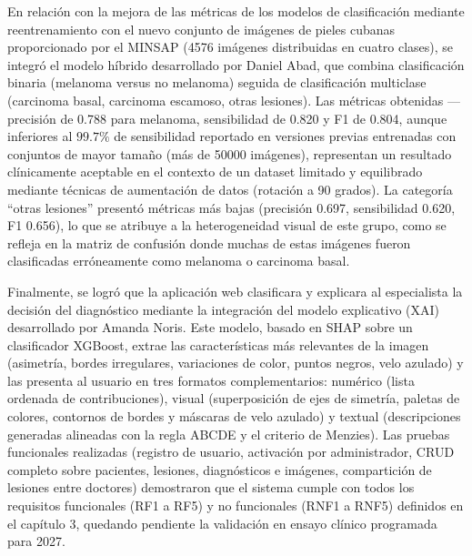 \begin{conclusions}
En relación con la mejora de las métricas de los modelos de clasificación mediante 
reentrenamiento con el nuevo conjunto de imágenes de pieles cubanas proporcionado por el 
MINSAP (4576 imágenes distribuidas en cuatro clases), se integró el modelo híbrido 
desarrollado por Daniel Abad, que combina clasificación binaria (melanoma versus no melanoma) 
seguida de clasificación multiclase (carcinoma basal, carcinoma escamoso, otras lesiones). 
Las métricas obtenidas —precisión de 0.788 para melanoma, sensibilidad de 0.820 y F1 de 
0.804, aunque inferiores al $99.7\%$ de sensibilidad reportado en versiones previas 
entrenadas con conjuntos de mayor tamaño (más de 50000 imágenes), representan un resultado 
clínicamente aceptable en el contexto de un dataset limitado y equilibrado mediante 
técnicas de aumentación de datos (rotación a 90 grados). La categoría “otras lesiones” 
presentó métricas más bajas (precisión 0.697, sensibilidad 0.620, F1 0.656), lo que se 
atribuye a la heterogeneidad visual de este grupo, como se refleja en la matriz de 
confusión donde muchas de estas imágenes fueron clasificadas erróneamente como melanoma o 
carcinoma basal.

Finalmente, se logró que la aplicación web clasificara y explicara al especialista la 
decisión del diagnóstico mediante la integración del modelo explicativo (XAI) desarrollado 
por Amanda Noris. Este modelo, basado en SHAP sobre un clasificador XGBoost, extrae las 
características más relevantes de la imagen (asimetría, bordes irregulares, variaciones 
de color, puntos negros, velo azulado) y las presenta al usuario en tres formatos 
complementarios: numérico (lista ordenada de contribuciones), visual (superposición de 
ejes de simetría, paletas de colores, contornos de bordes y máscaras de velo azulado) y 
textual (descripciones generadas alineadas con la regla ABCDE y el criterio de Menzies).
Las pruebas funcionales realizadas (registro de usuario, activación por administrador, 
CRUD completo sobre pacientes, lesiones, diagnósticos e imágenes, compartición de lesiones
entre doctores) demostraron que el sistema cumple con todos los requisitos funcionales 
(RF1 a RF5) y no funcionales (RNF1 a RNF5) definidos en el capítulo 3, quedando pendiente 
la validación en ensayo clínico programada para 2027.


\end{conclusions}
